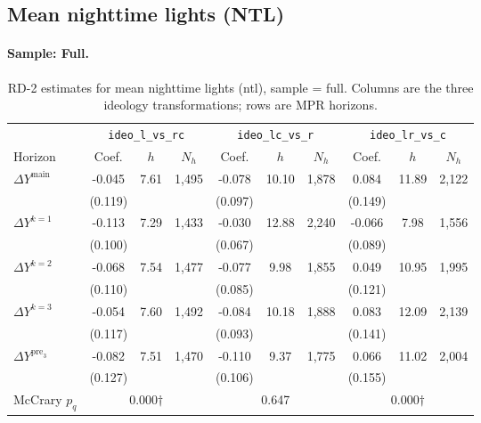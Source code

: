 \documentclass[11pt]{article}
\begin{document}
\clearpage
\subsection{Mean nighttime lights (NTL)}
\paragraph{Sample: Full.}
\begin{table}[H]
\centering
\scriptsize
\caption{RD-2 estimates for mean nighttime lights (ntl), sample = full.
Columns are the three ideology transformations; rows are MPR horizons.}
\label{tab:rd2_mean_night_all}
\begin{tabular}{l ccc ccc ccc}
\toprule
 & \multicolumn{3}{c}{\texttt{ideo\_l\_vs\_rc}}
 & \multicolumn{3}{c}{\texttt{ideo\_lc\_vs\_r}}
 & \multicolumn{3}{c}{\texttt{ideo\_lr\_vs\_c}} \\
\cmidrule(lr){2-4} \cmidrule(lr){5-7} \cmidrule(lr){8-10}
Horizon & Coef. & $h$ & $N_h$ & Coef. & $h$ & $N_h$ & Coef. & $h$ & $N_h$ \\
\midrule
$\Delta Y^{\text{main}}$ & -0.045 & 7.61 & 1,495 & -0.078 & 10.10 & 1,878 & 0.084 & 11.89 & 2,122 \\
 & (0.119) &  &  & (0.097) &  &  & (0.149) &  &  \\
\addlinespace[1pt]
$\Delta Y^{k=1}$ & -0.113 & 7.29 & 1,433 & -0.030 & 12.88 & 2,240 & -0.066 & 7.98 & 1,556 \\
 & (0.100) &  &  & (0.067) &  &  & (0.089) &  &  \\
\addlinespace[1pt]
$\Delta Y^{k=2}$ & -0.068 & 7.54 & 1,477 & -0.077 & 9.98 & 1,855 & 0.049 & 10.95 & 1,995 \\
 & (0.110) &  &  & (0.085) &  &  & (0.121) &  &  \\
\addlinespace[1pt]
$\Delta Y^{k=3}$ & -0.054 & 7.60 & 1,492 & -0.084 & 10.18 & 1,888 & 0.083 & 12.09 & 2,139 \\
 & (0.117) &  &  & (0.093) &  &  & (0.141) &  &  \\
\addlinespace[1pt]
$\Delta Y^{\text{pre}_3}$ & -0.082 & 7.51 & 1,470 & -0.110 & 9.37 & 1,775 & 0.066 & 11.02 & 2,004 \\
 & (0.127) &  &  & (0.106) &  &  & (0.155) &  &  \\
\addlinespace[1pt]
\midrule
McCrary $p_q$ & \multicolumn{3}{c}{0.000$\dagger$} & \multicolumn{3}{c}{0.647} & \multicolumn{3}{c}{0.000$\dagger$} \\
\bottomrule
\end{tabular}
\end{table}
\end{document}
